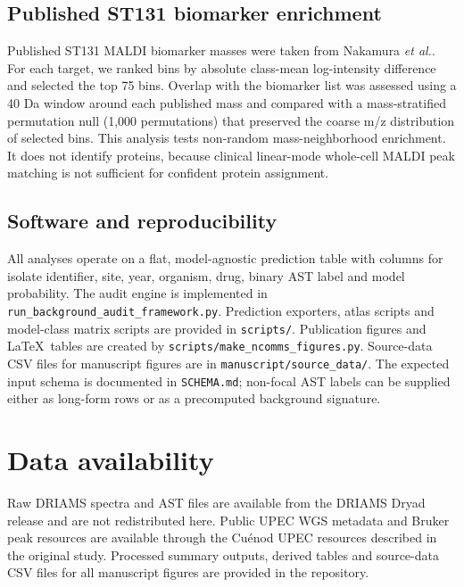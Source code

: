 \documentclass[11pt]{article}
\begin{document}
\subsection*{Published ST131 biomarker enrichment}

Published ST131 MALDI biomarker masses were taken from Nakamura \textit{et al.}\cite{nakamura2019st131}. For each target, we ranked bins by absolute class-mean log-intensity difference and selected the top 75 bins. Overlap with the biomarker list was assessed using a 40 Da window around each published mass and compared with a mass-stratified permutation null (1,000 permutations) that preserved the coarse m/z distribution of selected bins. This analysis tests non-random mass-neighborhood enrichment. It does not identify proteins, because clinical linear-mode whole-cell MALDI peak matching is not sufficient for confident protein assignment.

\subsection*{Software and reproducibility}

All analyses operate on a flat, model-agnostic prediction table with columns for isolate identifier, site, year, organism, drug, binary AST label and model probability. The audit engine is implemented in \texttt{run\_background\_audit\_framework.py}. Prediction exporters, atlas scripts and model-class matrix scripts are provided in \texttt{scripts/}. Publication figures and \LaTeX\ tables are created by \texttt{scripts/make\_ncomms\_figures.py}. Source-data CSV files for manuscript figures are in \texttt{manuscript/source\_data/}. The expected input schema is documented in \texttt{SCHEMA.md}; non-focal AST labels can be supplied either as long-form rows or as a precomputed background signature.

\section*{Data availability}

Raw DRIAMS spectra and AST files are available from the DRIAMS Dryad release\cite{driamsdryad} and are not redistributed here. Public UPEC WGS metadata and Bruker peak resources are available through the Cu\'{e}nod UPEC resources described in the original study\cite{cuenod2023papgii}. Processed summary outputs, derived tables and source-data CSV files for all manuscript figures are provided in the repository.
\end{document}
